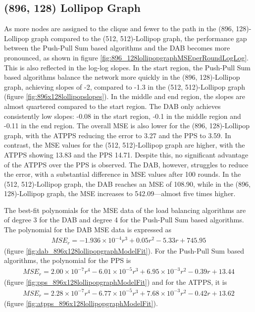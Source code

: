 \subsection{(896, 128) Lollipop Graph}\label{subsec:896_128lollipop}
As more nodes are assigned to the clique and fewer to the path in the (896, 128)-Lollipop graph compared to the (512, 512)-Lollipop graph, the performance gap between the Push-Pull Sum based algorithms and the DAB becomes more pronounced, as shown in figure \ref{fig:896_128lollipopgraphMSEperRoundLogLog}. This is also reflected in the log-log slopes. In the start region, the Push-Pull Sum based algorithms balance the network more quickly in the (896, 128)-Lollipop graph, achieving slopes of -2, compared to -1.3 in the (512, 512)-Lollipop graph (figure \ref{fig:896x128lollipopslopes}). In the middle and end region, the slopes are almost quartered compared to the start region. The DAB only achieves consistently low slopes: -0.08 in the start region, -0.1 in the middle region and -0.11 in the end region. The overall MSE is also lower for the (896, 128)-Lollipop graph, with the ATPPS reducing the error to 3.27 and the PPS to 3.59. In contrast, the MSE values for the (512, 512)-Lollipop graph are higher, with the ATPPS showing 13.83 and the PPS 14.71. Despite this, no significant advantage of the ATPPS over the PPS is observed. The DAB, however, struggles to reduce the error, with a substantial difference in MSE values after 100 rounds. In the (512, 512)-Lollipop graph, the DAB reaches an MSE of 108.90, while in the (896, 128)-Lollipop graph, the MSE increases to 542.09—almost five times higher.

The best-fit polynomials for the MSE data of the load balancing algorithms are of degree 3 for the DAB and degree 4 for the Push-Pull Sum based algorithms. The polynomial for the DAB MSE data is expressed as 
\begin{align}
    MSE_r=-1.936\times 10^{-4}r^{3}+0.05r^{2}-5.33r+745.95    
\end{align}
(figure \ref{fig:dab_896x128lollipopgraphModelFit}). For the Push-Pull Sum based algorithms, the polynomial for the PPS is 
\begin{align}
    MSE_r=2.00\times 10^{-7}r^{4}-6.01\times 10^{-5}r^{3}+6.95\times 10^{-3}r^{2}-0.39r+13.44
\end{align}
(figure \ref{fig:pps_896x128lollipopgraphModelFit}) and for the ATPPS, it is
\begin{align}
    MSE_r=2.28\times 10^{-7}r^{4}-6.77\times 10^{-5}r^{3}+7.68\times 10^{-3}r^{2}-0.42r+13.62    
\end{align}
(figure \ref{fig:atpps_896x128lollipopgraphModelFit}).

